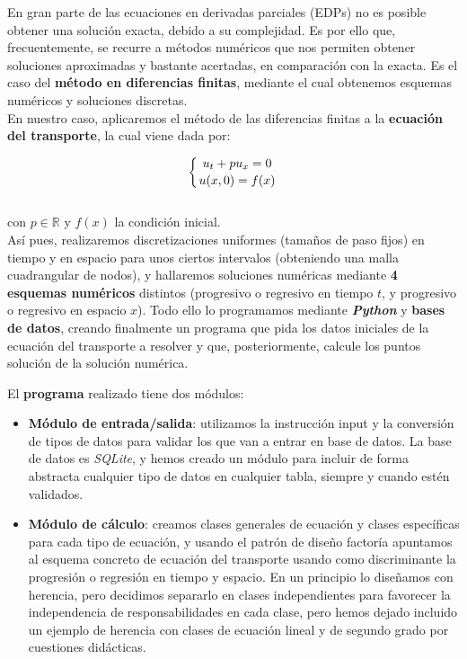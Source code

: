 \documentclass[a4paper,12pt]{article}
\begin{document}
En gran parte de las ecuaciones en derivadas parciales (EDPs) no es posible obtener una solución exacta, debido a su complejidad. Es por ello que, frecuentemente, se recurre a métodos numéricos que nos permiten obtener soluciones aproximadas y bastante acertadas, en comparación con la exacta. Es el caso del \textbf{método en diferencias finitas}, mediante el cual obtenemos esquemas numéricos y soluciones discretas. \\


En nuestro caso, aplicaremos el método de las diferencias finitas a la \textbf{ecuación del transporte}, la cual viene dada por:

$$
\left\{
u_t+p u_x = 0\atop
u(x,0) = f(x)
\right.
$$
\\
con $p \in \mathbb{R}$ y $f(x)$ la condición inicial. \\

Así pues, realizaremos discretizaciones uniformes (tamaños de paso fijos) en tiempo y en espacio para unos ciertos intervalos (obteniendo una malla cuadrangular de nodos), y hallaremos soluciones numéricas mediante \textbf{4 esquemas numéricos} distintos (progresivo o regresivo en tiempo $t$, y progresivo o regresivo en espacio $x$). Todo ello lo programamos mediante \textit{\textbf{Python}} y \textbf{bases de datos}, creando finalmente un programa que pida los datos iniciales de la ecuación del transporte a resolver y que, posteriormente, calcule los puntos solución de la solución numérica. \newpage

El \textbf{programa} realizado tiene dos módulos:
\begin{itemize}
	\item \textbf{Módulo de entrada/salida}: utilizamos la instrucción input y la conversión de tipos de datos para validar los que van a entrar en base de datos. La base de datos es \textit{SQLite}, y hemos creado un módulo para incluir de forma abstracta cualquier tipo de datos en cualquier tabla, siempre y cuando estén validados.
	\item \textbf{Módulo de cálculo}: creamos clases generales de ecuación y clases específicas para cada tipo de ecuación, y usando el patrón de diseño factoría apuntamos al esquema concreto de ecuación del transporte usando como discriminante la progresión o regresión en tiempo y espacio. En un principio lo diseñamos con herencia, pero decidimos separarlo en clases independientes para favorecer la independencia de responsabilidades en cada clase, pero hemos dejado incluido un ejemplo de herencia con clases de ecuación lineal y de segundo grado por cuestiones didácticas.
\end{itemize}
\end{document}
